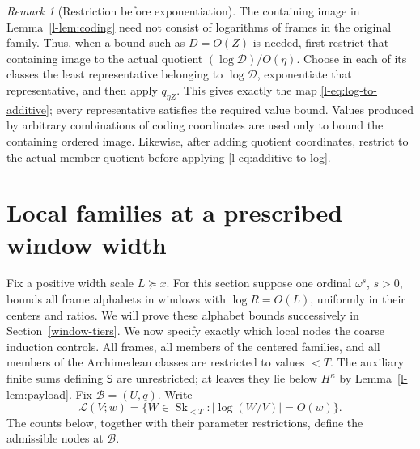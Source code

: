 \documentclass[11pt]{article}
\theoremstyle{definition}
\theoremstyle{remark}
\newtheorem{remark}[theorem]{Remark}
\newcommand{\Sk}{\operatorname{Sk}}
\newcommand{\SSS}{\mathsf S}
\newcommand{\calB}{\mathcal B}
\newcommand{\calL}{\mathcal L}
\numberwithin{equation}{section}
\begin{document}
\begin{remark}[Restriction before exponentiation]\label{l-rem:restricted-exp}
The containing image in Lemma~\ref{l-lem:coding} need not consist
of logarithms of frames in the original family.  Thus, when a
bound such as $D=O(Z)$ is needed, first restrict that containing
image to the actual quotient $(\log\mathcal D)/O(\eta)$.
Choose in each of its classes the least representative belonging
to $\log\mathcal D$, exponentiate that representative, and then
apply $q_{\eta Z}$.  This gives exactly the map
\eqref{l-eq:log-to-additive}; every representative satisfies the
required value bound.  Values produced by arbitrary combinations
of coding coordinates are used only to bound the containing
ordered image.  Likewise, after adding quotient coordinates,
restrict to the actual member quotient before applying
\eqref{l-eq:additive-to-log}.
\end{remark}

\section[Local families at a prescribed width]{Local families at a prescribed window width}\label{l-ordinary-defs}

Fix a positive width scale $L\succeq x$. For this section suppose
one ordinal $\omega^s$, $s>0$, bounds all frame alphabets in windows
with $\log R=O(L)$, uniformly in their centers and ratios. We will
prove these alphabet bounds successively in Section~\ref{window-tiers}.
We now specify exactly which local nodes the coarse induction controls.
All frames, all members of the centered families, and all members
of the Archimedean classes are restricted to values $<T$.
The auxiliary finite sums defining $\SSS$ are unrestricted;
at leaves they lie below $H^\kappa$ by Lemma~\ref{l-lem:payload}.
Fix $\calB=(U,q)$.
Write
\[
 \calL(V;w)=\{W\in\Sk_{<T}:|\log(W/V)|=O(w)\}.
\]
The counts below, together with their parameter restrictions, define
the admissible nodes at $\calB$.
\end{document}
